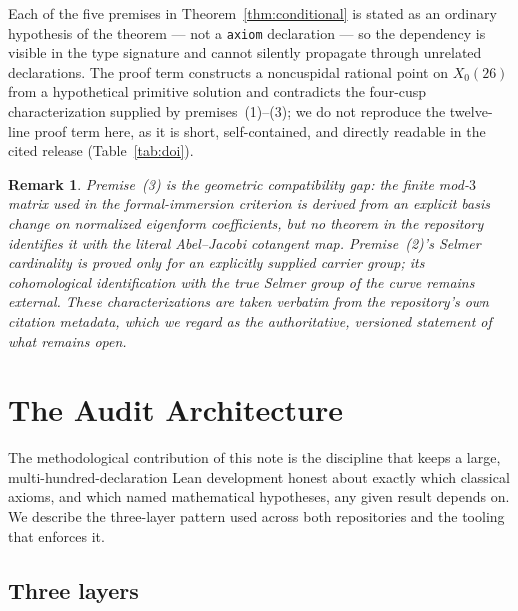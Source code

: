 \documentclass{amsart}
\newtheorem{remark}[theorem]{Remark}
\begin{document}
Each of the five premises in Theorem~\ref{thm:conditional} is stated as an
ordinary hypothesis of the theorem — not a \texttt{axiom} declaration —
so the dependency is visible in the type signature and cannot silently
propagate through unrelated declarations. The proof term constructs a
noncuspidal rational point on $X_0(26)$ from a hypothetical primitive
solution and contradicts the four-cusp characterization supplied by
premises~(1)–(3); we do not reproduce the twelve-line proof term here, as
it is short, self-contained, and directly readable in the cited release
(Table~\ref{tab:doi}).

\begin{remark}
Premise~(3) is the geometric compatibility gap: the finite mod-$3$ matrix
used in the formal-immersion criterion is derived from an explicit basis
change on normalized eigenform coefficients, but no theorem in the
repository identifies it with the literal Abel--Jacobi cotangent map.
Premise~(2)'s Selmer cardinality is proved only for an explicitly supplied
carrier group; its cohomological identification with the true Selmer
group of the curve remains external. These characterizations are taken
verbatim from the repository's own citation metadata, which we regard as
the authoritative, versioned statement of what remains open.
\end{remark}

\section{The Audit Architecture}
\label{sec:audit}

The methodological contribution of this note is the discipline that keeps
a large, multi-hundred-declaration Lean development honest about exactly
which classical axioms, and which named mathematical hypotheses, any given
result depends on. We describe the three-layer pattern used across both
repositories and the tooling that enforces it.

\subsection{Three layers}
\end{document}
